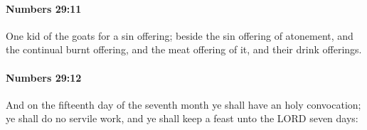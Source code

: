 		\paragraph{Numbers 29:11} %
			\label{NUMBERS-29-11}

			One kid of the goats for a sin offering; beside the sin offering of atonement, and the continual burnt offering, and the meat offering of it, and their drink offerings.


		\paragraph{Numbers 29:12} %
			\label{NUMBERS-29-12}

			And on the fifteenth day of the seventh month ye shall have an holy convocation; ye shall do no servile work, and ye shall keep a feast unto the LORD seven days:


